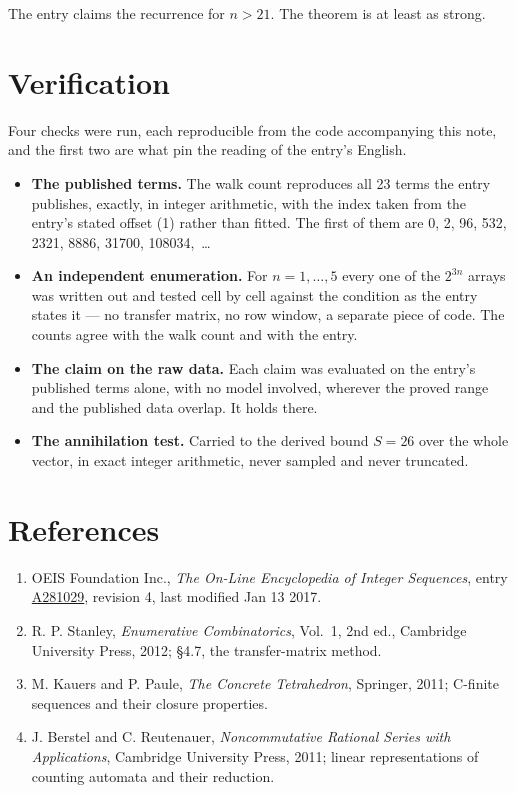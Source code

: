 \documentclass[11pt]{article}
\theoremstyle{definition}
\begin{document}
The entry claims the recurrence for $n > 21$. The theorem is at least as strong.

\section{Verification}

Four checks were run, each reproducible from the code accompanying this note, and the first two are what pin the reading of the entry's English.

\begin{itemize}

\item {\bfseries The published terms.} The walk count reproduces all 23 terms the entry publishes, exactly, in integer arithmetic, with the index taken from the entry's stated offset (1) rather than fitted. The first of them are 0, 2, 96, 532, 2321, 8886, 31700, 108034,~\dots

\item {\bfseries An independent enumeration.} For $n = 1,\dots,5$ every one of the $2^{3n}$ arrays was written out and tested cell by cell against the condition as the entry states it --- no transfer matrix, no row window, a separate piece of code. The counts agree with the walk count and with the entry.

\item {\bfseries The claim on the raw data.} Each claim was evaluated on the entry's published terms alone, with no model involved, wherever the proved range and the published data overlap. It holds there.

\item {\bfseries The annihilation test.} Carried to the derived bound $S = 26$ over the whole vector, in exact integer arithmetic, never sampled and never truncated.

\end{itemize}

\section{References}

\begin{enumerate}

\item OEIS Foundation Inc., \emph{The On-Line Encyclopedia of Integer Sequences}, entry \href{https://oeis.org/A281029}{A281029}, revision 4, last modified Jan 13 2017.

\item R. P. Stanley, \emph{Enumerative Combinatorics}, Vol.~1, 2nd ed., Cambridge University Press, 2012; \S4.7, the transfer-matrix method.

\item M. Kauers and P. Paule, \emph{The Concrete Tetrahedron}, Springer, 2011; C-finite sequences and their closure properties.

\item J. Berstel and C. Reutenauer, \emph{Noncommutative Rational Series with Applications}, Cambridge University Press, 2011; linear representations of counting automata and their reduction.

\end{enumerate}
\end{document}
